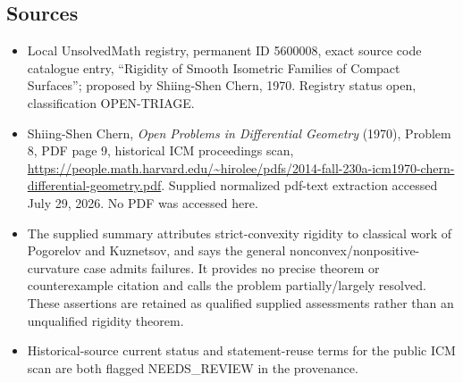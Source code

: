 \documentclass[11pt]{article}
\begin{document}
\subsection{Sources}
\begin{itemize}
\item Local UnsolvedMath registry, permanent ID 5600008, exact source code catalogue entry, ``Rigidity of Smooth Isometric Families of Compact Surfaces''; proposed by Shiing-Shen Chern, 1970. Registry status open, classification OPEN-TRIAGE.
\item Shiing-Shen Chern, \emph{Open Problems in Differential Geometry} (1970), Problem 8, PDF page 9, historical ICM proceedings scan, \url{https://people.math.harvard.edu/~hirolee/pdfs/2014-fall-230a-icm1970-chern-differential-geometry.pdf}. Supplied normalized pdf-text extraction accessed July 29, 2026. No PDF was accessed here.
\item The supplied summary attributes strict-convexity rigidity to classical work of Pogorelov and Kuznetsov, and says the general nonconvex/nonpositive-curvature case admits failures. It provides no precise theorem or counterexample citation and calls the problem partially/largely resolved. These assertions are retained as qualified supplied assessments rather than an unqualified rigidity theorem.
\item Historical-source current status and statement-reuse terms for the public ICM scan are both flagged NEEDS\_REVIEW in the provenance.
\end{itemize}
\end{document}
